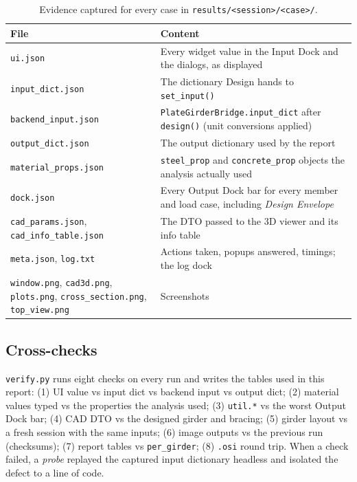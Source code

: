 \documentclass[11pt,a4paper]{article}
\begin{document}
\begin{table}[htbp]
\caption{Evidence captured for every case in \texttt{results/<session>/<case>/}.}\label{tab:evidence}
\footnotesize
\begin{tabularx}{\linewidth}{@{}lY@{}}
\toprule
\textbf{File} & \textbf{Content} \\
\midrule
\texttt{ui.json} & Every widget value in the Input Dock and the dialogs, as displayed \\
\texttt{input\_dict.json} & The dictionary Design hands to \texttt{set\_input()} \\
\texttt{backend\_input.json} & \texttt{PlateGirderBridge.input\_dict} after \texttt{design()} (unit conversions applied) \\
\texttt{output\_dict.json} & The output dictionary used by the report \\
\texttt{material\_props.json} & \texttt{steel\_prop} and \texttt{concrete\_prop} objects the analysis actually used \\
\texttt{dock.json} & Every Output Dock bar for every member and load case, including \emph{Design Envelope} \\
\texttt{cad\_params.json}, \texttt{cad\_info\_table.json} & The DTO passed to the 3D viewer and its info table \\
\texttt{meta.json}, \texttt{log.txt} & Actions taken, popups answered, timings; the log dock \\
\texttt{window.png}, \texttt{cad3d.png}, \texttt{plots.png}, \texttt{cross\_section.png}, \texttt{top\_view.png} & Screenshots \\
\bottomrule
\end{tabularx}
\end{table}

\subsection{Cross-checks}
\texttt{verify.py} runs eight checks on every run and writes the tables used in this report: (1) UI value vs input dict vs
backend input vs output dict; (2) material values typed vs the properties the analysis used; (3) \texttt{util.*} vs the worst
Output Dock bar; (4) CAD DTO vs the designed girder and bracing; (5) girder layout vs a fresh session with the same inputs;
(6) image outputs vs the previous run (checksums); (7) report tables vs \texttt{per\_girder}; (8) \texttt{.osi} round trip.
When a check failed, a \emph{probe} replayed the captured input dictionary headless and isolated the defect to a line of code.
\end{document}
